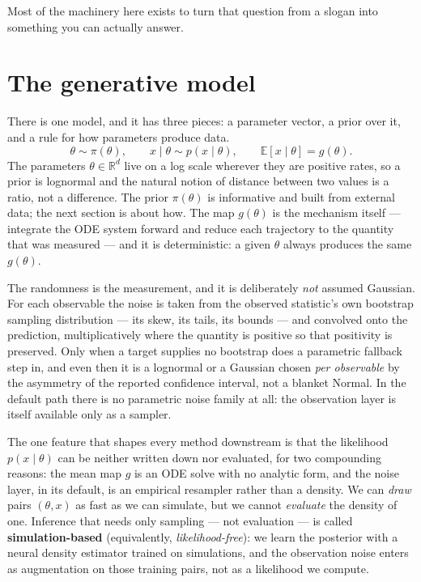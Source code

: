 \documentclass[11pt]{article}
\newcommand{\vocab}[1]{\textcolor{vocabc}{\textbf{#1}}}
\renewcommand{\th}{\theta}
\begin{document}
Most of the machinery here exists to turn that question from a slogan into something you
can actually answer.

\section{The generative model}

There is one model, and it has three pieces: a parameter vector, a prior over it, and a
rule for how parameters produce data.
\[
  \th \sim \pi(\th), \qquad x \mid \th \sim p(x \mid \th), \qquad \mathbb{E}[x \mid \th] = g(\th).
\]
The parameters $\th \in \mathbb{R}^d$ live on a log scale wherever they are positive
rates, so a prior is lognormal and the natural notion of distance between two values is
a ratio, not a difference. The prior $\pi(\th)$ is informative and built from external
data; the next section is about how. The map $g(\th)$ is the mechanism itself ---
integrate the ODE system forward and reduce each trajectory to the quantity that was
measured --- and it is deterministic: a given $\th$ always produces the same $g(\th)$.

The randomness is the measurement, and it is deliberately \emph{not} assumed Gaussian.
For each observable the noise is taken from the observed statistic's own bootstrap
sampling distribution --- its skew, its tails, its bounds --- and convolved onto the
prediction, multiplicatively where the quantity is positive so that positivity is
preserved. Only when a target supplies no bootstrap does a parametric fallback step in,
and even then it is a lognormal or a Gaussian chosen \emph{per observable} by the
asymmetry of the reported confidence interval, not a blanket Normal. In the default path
there is no parametric noise family at all: the observation layer is itself available
only as a sampler.

The one feature that shapes every method downstream is that the likelihood
$p(x \mid \th)$ can be neither written down nor evaluated, for two compounding reasons:
the mean map $g$ is an ODE solve with no analytic form, and the noise layer, in its
default, is an empirical resampler rather than a density. We can \emph{draw} pairs
$(\th, x)$ as fast as we can simulate, but we cannot \emph{evaluate} the density of one.
Inference that needs only sampling --- not evaluation --- is called
\vocab{simulation-based} (equivalently, \emph{likelihood-free}): we learn the posterior
with a neural density estimator trained on simulations, and the observation noise enters
as augmentation on those training pairs, not as a likelihood we compute.
\end{document}
